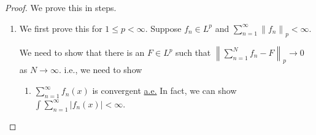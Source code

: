 \begin{proof}
	We prove this in steps.
	\begin{enumerate}
		\item We first prove this for \(1\leq p<\infty \). Suppose \(f_{n} \in L^p\) and \(\sum\limits_{n=1}^{\infty} \left\lVert f_{n} \right\rVert_{p}<\infty \).

		      We need to show that there is an \(F\in L^p\) such that \(\left\lVert \sum\limits_{n=1}^{N} f_{n} -F\right\rVert_{p}\to 0\) as \(N\to \infty \). i.e., we need to show
		      \begin{enumerate}
			      \item \(\sum\limits_{n=1}^{\infty} f_{n}(x)\) is convergent \hyperref[def:mu-almost-everywhere]{a.e.} In fact, we can show \(\int \sum\limits_{n=1}^{\infty} \left\vert f_{n} (x) \right\vert < \infty \).


\end{enumerate}
\end{enumerate}
\end{proof}

